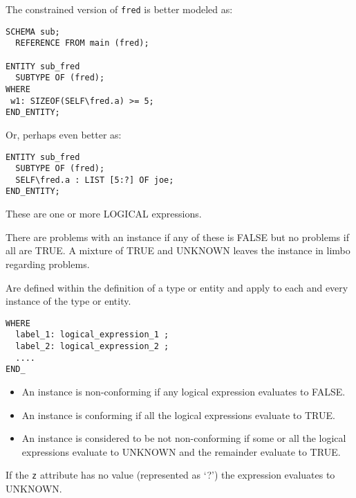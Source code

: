 \clearpage

The constrained version of \texttt{fred} is better modeled as:

\begin{verbatim}
SCHEMA sub;
  REFERENCE FROM main (fred);

ENTITY sub_fred
  SUBTYPE OF (fred);
WHERE
 w1: SIZEOF(SELF\fred.a) >= 5;
END_ENTITY;
\end{verbatim}

Or, perhaps even better as:
\begin{verbatim}
ENTITY sub_fred
  SUBTYPE OF (fred);
  SELF\fred.a : LIST [5:?] OF joe;
END_ENTITY;
\end{verbatim}


\begin{remarks}
\remintro
{}

These are one or more LOGICAL expressions.

There are problems with an instance if any of these is FALSE but
no problems if all are TRUE. A mixture of TRUE and UNKNOWN leaves
the instance in limbo regarding problems.

\remend
\end{remarks}


    Are defined within the definition of a type or entity and apply to 
each and every instance of the type or entity.

\begin{verbatim}
WHERE
  label_1: logical_expression_1 ;
  label_2: logical_expression_2 ;
  ....
END_
\end{verbatim}


\begin{itemize}
\item An instance is non-conforming if any logical expression evaluates 
      to FALSE.
\item An instance is conforming if all the logical expressions evaluate 
      to TRUE.
\item An instance is considered to be not non-conforming if some or all the 
      logical expressions evaluate to UNKNOWN and the remainder evaluate 
      to TRUE.
\end{itemize}


\begin{remarks}
\remintro
{}

If the \texttt{z} attribute has no value (represented as `?') the
expression evaluates to UNKNOWN.

\remend
\end{remarks}


